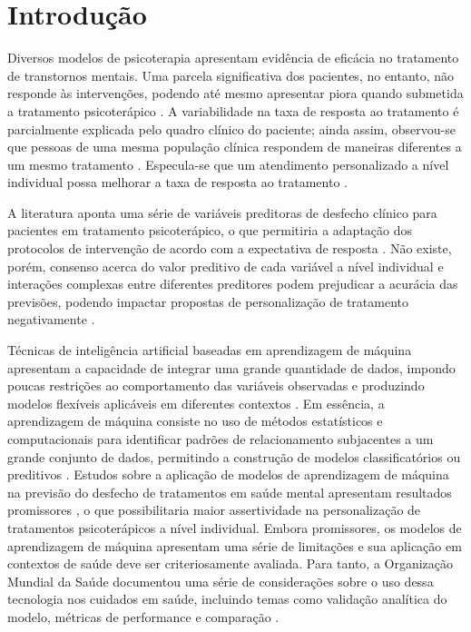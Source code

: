 \section{Introdução}

Diversos modelos de psicoterapia apresentam evidência de eficácia no tratamento de transtornos mentais. Uma parcela significativa dos pacientes,
no entanto, não responde às intervenções, podendo até mesmo apresentar piora quando submetida a tratamento psicoterápico \cite{Cuijpers2021}. A
variabilidade na taxa de resposta ao tratamento é parcialmente explicada pelo quadro clínico do paciente; ainda assim, observou-se que pessoas
de uma mesma população clínica respondem de maneiras diferentes a um mesmo tratamento \cite{Hofmann2012}. Especula-se que um atendimento personalizado
a nível individual possa melhorar a taxa de resposta ao tratamento \cite{Norcross2010, Norcross2018}.

A literatura aponta uma série de variáveis preditoras de desfecho clínico para pacientes em tratamento psicoterápico, o que permitiria a adaptação
dos protocolos de intervenção de acordo com a expectativa de resposta \cite{Smagula2019, Andover2020}. Não existe, porém, consenso acerca do valor
preditivo de cada variável a nível individual e interações complexas entre diferentes preditores podem prejudicar a acurácia das previsões, podendo
impactar propostas de personalização de tratamento negativamente \cite{Taubitz2022}.

Técnicas de inteligência artificial baseadas em aprendizagem de máquina apresentam a capacidade de integrar uma grande quantidade de dados, impondo
poucas restrições ao comportamento das variáveis observadas e produzindo modelos flexíveis aplicáveis em diferentes contextos \cite{Dwyer2018}. Em
essência, a aprendizagem de máquina consiste no uso de métodos estatísticos e computacionais para identificar padrões de relacionamento subjacentes
a um grande conjunto de dados, permitindo a construção de modelos classificatórios ou preditivos \cite{Roth2018}. Estudos sobre a aplicação de modelos
de aprendizagem de máquina na previsão do desfecho de tratamentos em saúde mental apresentam resultados promissores \cite{Dwyer2018}, o que possibilitaria
maior assertividade na personalização de tratamentos psicoterápicos a nível individual. Embora promissores, os modelos de aprendizagem de máquina apresentam
uma série de limitações e sua aplicação em contextos de saúde deve ser criteriosamente avaliada. Para tanto, a Organização Mundial da Saúde documentou uma
série de considerações sobre o uso dessa tecnologia nos cuidados em saúde, incluindo temas como validação analítica do modelo, métricas de performance e
comparação \cite{WHO2023}.

